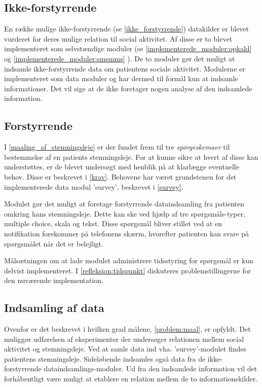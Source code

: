 \subsection{Ikke-forstyrrende}
En række mulige ikke-forstyrrende (se \cref{ikke_forstyrrende}) datakilder er blevet vurderet for deres mulige relation til social aktivitet.
Af disse er to blevet implementeret som selvstændige moduler (se \cref{implementerede_moduler:opkald}  og \cref{implementerede_moduler:smsmms} ).
De to moduler gør det muligt at indsamle ikke-forstyrrende data om patientens sociale aktivitet.
Modulerne er implementeret som data moduler og har dermed til formål kun at indsamle informationer.
Det vil sige at de ikke foretager nogen analyse af den indsamlede information.

\subsection{Forstyrrende}
I \cref{maaling_af_stemningsleje} er der fundet frem til tre \textit{spørgeskemaer} til bestemmelse af en patients stemningsleje.
For at kunne sikre at hvert af disse kan understøttes, er de blevet undersøgt med henblik på at klarlægge eventuelle behov.
Disse er beskrevet i \cref{krav}.
Behovene har været grundstenen for det implementerede data modul 'survey', beskrevet i \cref{survey}.

Modulet gør det muligt at foretage forstyrrende dataindsamling fra patienten omkring hans stemningsleje.
Dette kan ske ved hjælp af tre spørgsmåls-typer, multiple choice, skala og tekst.
Disse spørgsmål bliver stillet ved at en notifikation forekommer på telefonens skærm, hvorefter patienten kan svare på spørgsmålet når det er belejligt.

Målsætningen om at lade modulet administrere tidsstyring for spørgsmål er kun delvist implementeret.
I \cref{refleksion:tidspunkt} diskuteres problemstillingerne for den nuværende implementation.
\subsection{Indsamling af data}
Ovenfor er det beskrevet i hvilken grad målene, \cref{problem:maal}, er opfyldt.
Det muliggør udførelsen af eksperimenter der undersøger relationen mellem social aktivitet og stemningsleje.
Ved at samle data ind vha. 'survey'-modulet findes patientens stemningsleje.
Sideløbende indsamles også data fra de ikke-forstyrrende dataindsamlings-moduler.
Ud fra den indsamlede information vil det forhåbentligt være muligt at etablere en relation mellem de to informationskilder.

